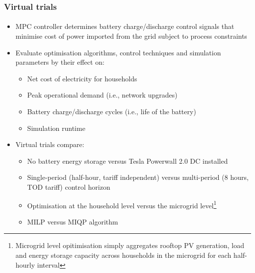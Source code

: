 \documentclass[handout, smaller, xcolor=table]{beamer}			%
\begin{document}
\begin{frame}
	\frametitle{Virtual trials}
	\framesubtitle{}

	\begin{itemize}
		\item  MPC controller determines battery charge/discharge control signals that minimise cost of power imported from the grid subject to process constraints
		
		\item  Evaluate optimisation algorithms, control techniques and simulation parameters by their effect on:
		\begin{itemize}
			\item  Net cost of electricity for households
			\item  Peak operational demand (i.e., network upgrades)
			\item  Battery charge/discharge cycles (i.e., life of the battery)
			\item  Simulation runtime
		\end{itemize}
		
		\item  Virtual trials compare:
		\begin{itemize}
			\item  No battery energy storage versus Tesla Powerwall 2.0 DC installed
			\item  Single-period (half-hour, tariff independent) versus multi-period (8 hours, TOD tariff) control horizon
			\item  Optimisation at the household level versus the microgrid level\footnote{\scriptsize Microgrid level opitimisation simply aggregates rooftop PV generation, load and energy storage capacity across households in the microgrid for each half-hourly interval
			}
			\item  MILP versus MIQP algorithm
		\end{itemize}
	
	\end{itemize}

\end{frame}
\end{document}
